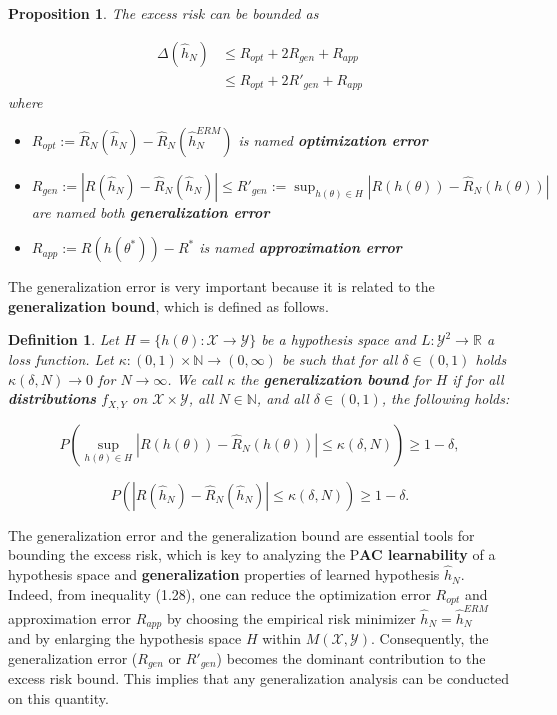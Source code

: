 \documentclass{report}
\newtheorem{definition}{Definition}[chapter]
\newtheorem{proposition}{Proposition}[chapter]
\begin{document}
\begin{proposition}
The excess risk can be bounded as

\begin{equation}
\begin{split}
\Delta(\hat{h}_N) & \leq R_{opt} + 2R_{gen} + R_{app}\\
&\leq R_{opt} + 2R'_{gen} + R_{app}
\end{split}
\end{equation}
where

\begin{itemize}
\item $R_{opt} := \hat{R}_N(\hat{h}_N)-\hat{R}_N(\hat{h}^{ERM}_N)$ is named \textbf{optimization error}
\item $R_{gen} := |R(\hat{h}_N)-\hat{R}_N(\hat{h}_N)| \leq R'_{gen} := \sup_{h(\theta) \in H}|R(h(\theta))-\hat{R}_N(h(\theta))|$ are named both \textbf{generalization error}
\item $R_{app} := R(h(\theta^*))-R^*$ is named \textbf{approximation error}
\end{itemize}
\end{proposition}
The generalization error is very important because it is related to the \textbf{generalization bound}, which is defined as follows.

\begin{definition}
Let $H = \{h(\theta) : \mathcal{X} \to \mathcal{Y}\}$ be a hypothesis space and $L:\mathcal{Y}^2 \to \mathbb{R}$ a loss function. Let $\kappa : (0,1) \times \mathbb{N} \to (0,\infty)$ be such that for all $\delta \in (0,1)$ holds $\kappa(\delta, N) \to 0$ for $N \to \infty$. We call $\kappa$ the \textbf{generalization bound} for $H$ if for all \textbf{distributions} $f_{X,Y}$ on $\mathcal{X} \times \mathcal{Y}$, all $N \in \mathbb{N}$, and all $\delta \in (0,1)$, the following holds:

\begin{equation}
P\left(\sup_{h(\theta) \in H}|R(h(\theta))-\hat{R}_N(h(\theta))|\leq \kappa(\delta, N)\right) \geq 1-\delta,
\end{equation}

\begin{equation}
P\left(|R(\hat{h}_N)-\hat{R}_N(\hat{h}_N)|\leq \kappa(\delta, N)\right) \geq 1-\delta.
\end{equation}
\end{definition}
The generalization error and the generalization bound are essential tools for bounding the excess risk, which is key to analyzing the P\textbf{AC learnability} of a hypothesis space and \textbf{generalization} properties of learned hypothesis $\hat{h}_N$. Indeed, from inequality (1.28), one can reduce the optimization error $R_{opt}$ and approximation error $R_{app}$ by choosing the empirical risk minimizer $\hat{h}_N = \hat{h}^{ERM}_N$ and by enlarging the hypothesis space $H$ within $M(\mathcal{X}, \mathcal{Y})$. Consequently, the generalization error ($R_{gen}$ or $R'_{gen}$) becomes the dominant contribution to the excess risk bound. This implies that any generalization analysis can be conducted on this quantity.
\end{document}
